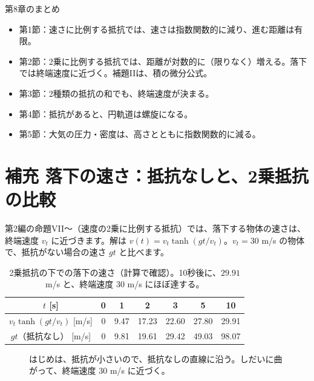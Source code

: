 \documentclass[a4paper,11pt,openany]{ltjsbook}
\begin{document}
\begin{pointbox}{第8章のまとめ}
\begin{itemize}[leftmargin=1.5em]
\item 第1節：速さに比例する抵抗では、速さは指数関数的に減り、進む距離は有限。
\item 第2節：2乗に比例する抵抗では、距離が対数的に（限りなく）増える。落下では終端速度に近づく。補題IIは、積の微分公式。
\item 第3節：2種類の抵抗の和でも、終端速度が決まる。
\item 第4節：抵抗があると、円軌道は螺旋になる。
\item 第5節：大気の圧力・密度は、高さとともに指数関数的に減る。
\end{itemize}
\end{pointbox}

\section{補充 落下の速さ：抵抗なしと、2乗抵抗の比較}

第2編の命題VII〜（速度の2乗に比例する抵抗）では、落下する物体の速さは、終端速度 $v_t$ に近づきます。解は $v(t)=v_t\tanh(gt/v_t)$。$v_t=30$ m/s の物体で、抵抗がない場合の速さ $gt$ と比べます。

\begin{table}[htbp]
\centering
\begin{tabular}{c|cccccc}
\toprule
$t$ [s] & 0 & 1 & 2 & 3 & 5 & 10\\
\midrule
$v_t\tanh(gt/v_t)$ [m/s] & 0 & 9.47 & 17.23 & 22.60 & 27.80 & 29.91\\
$gt$（抵抗なし） [m/s] & 0 & 9.81 & 19.61 & 29.42 & 49.03 & 98.07\\
\bottomrule
\end{tabular}
\caption{2乗抵抗の下での落下の速さ（計算で確認）。10秒後に、$29.91$ m/s と、終端速度 $30$ m/s にほぼ達する。}
\end{table}

\begin{figure}[htbp]
\centering
{}
\caption{はじめは、抵抗が小さいので、抵抗なしの直線に沿う。しだいに曲がって、終端速度 $30$ m/s に近づく。}
\end{figure}
\end{document}
